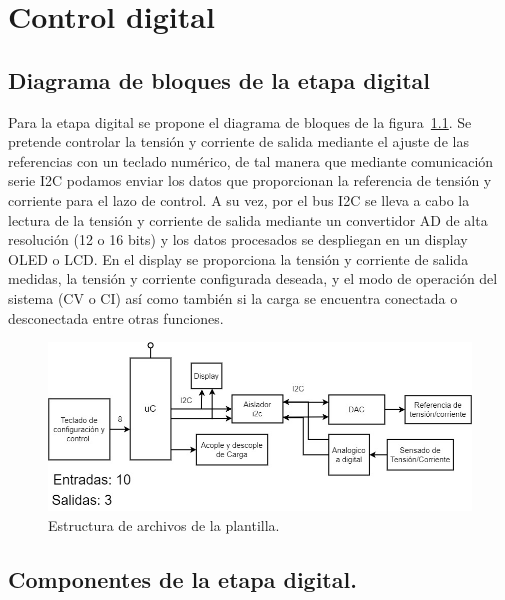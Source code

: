 \chapter{Control digital}

\label{C:Digitalización y control}

\section{Diagrama de bloques de la etapa digital}
Para la etapa digital se propone el diagrama de bloques de la figura~\ref{F:diagrama_digital}. Se pretende controlar la tensión y corriente de salida mediante el ajuste de las referencias con un teclado numérico, de tal manera que mediante comunicación serie I2C podamos enviar los datos que proporcionan la referencia de tensión y corriente para el lazo de control. A su vez, por el bus I2C se lleva a cabo la lectura de la tensión y corriente de salida mediante un convertidor AD de alta resolución (12 o 16 bits) y los datos procesados se despliegan en un display OLED o LCD. En el display se proporciona la tensión y corriente de salida medidas, la tensión y corriente configurada deseada, y el modo de operación del sistema (CV o CI) así como también si la carga se encuentra conectada o desconectada entre otras funciones. 

\begin{figure} [H]
    \centering
    \includegraphics[scale=0.5]{./imagenes/diagrama_digital.jpg}
    \caption{Estructura de archivos de la plantilla.}
    \label{F:diagrama_digital}
\end{figure}

\section{Componentes de la etapa digital.}

